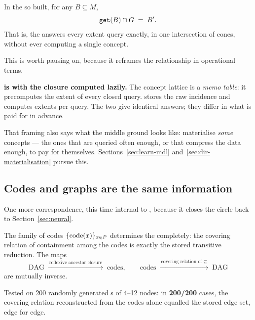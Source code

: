 \begin{proposition}
\label{prop:context-to-dag}
In the \odag{} so built, for any $B \subseteq M$,
\[
  \texttt{get}(B) \cap G \;=\; B' .
\]
That is, the \odag{} answers every \fca{} extent query exactly, in one
intersection of cones, without ever computing a single concept.
\end{proposition}

This is worth pausing on, because it reframes the relationship in operational
terms.

\begin{keyidea}
\textbf{\odag{} is \fca{} with the closure computed lazily.} The concept
lattice is a \emph{memo table}: it precomputes the extent of every closed
query. \odag{} stores the raw incidence and computes extents per query. The
two give identical answers; they differ in what is paid for in advance.

That framing also says what the middle ground looks like: materialise
\emph{some} concepts --- the ones that are queried often enough, or that
compress the data enough, to pay for themselves. Sections~\ref{sec:learn-mdl}
and~\ref{sec:dir-materialisation} pursue this.
\end{keyidea}

\subsection{Codes and graphs are the same information}

One more correspondence, this time internal to \odag{}, because it closes the
circle back to Section~\ref{sec:neural}.

\begin{proposition}
\label{prop:roundtrip}
The family of codes $\{\mathrm{code}(x)\}_{x \in P}$ determines the \odag{}
completely: the covering relation of containment among the codes is exactly
the stored transitive reduction. The maps
\[
  \text{DAG} \;\xrightarrow{\ \text{reflexive ancestor closure}\ }\; \text{codes},
  \qquad
  \text{codes} \;\xrightarrow{\ \text{covering relation of } \subseteq\ }\;
  \text{DAG}
\]
are mutually inverse.
\end{proposition}

\begin{measured}
Tested on 200 randomly generated \odag{}s of 4--12 nodes: in
\textbf{200/200} cases, the covering relation reconstructed from the codes
alone equalled the stored edge set, edge for edge.
\end{measured}

